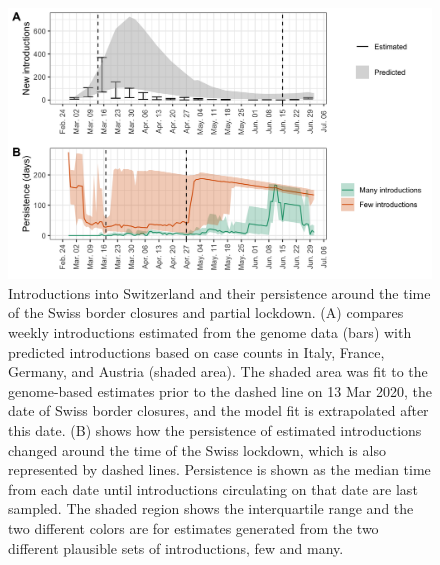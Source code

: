 \documentclass[9pt,twoside,lineno]{pnas-new}
\begin{document}
\begin{figure}[h!]
    \centering
    \includegraphics[width=\linewidth]{figures/introductions_and_persistence_v2.png}
    \caption{Introductions into Switzerland and their persistence around the time of the Swiss border closures and partial lockdown. (A) compares weekly introductions estimated from the genome data (bars) with predicted introductions based on case counts in Italy, France, Germany, and Austria (shaded area). The shaded area was fit to the genome-based estimates prior to the dashed line on 13 Mar 2020, the date of Swiss border closures, and the model fit is extrapolated after this date. (B) shows how the persistence of estimated introductions changed around the time of the Swiss lockdown, which is also represented by dashed lines. Persistence is shown as the median time from each date until introductions circulating on that date are last sampled. The shaded region shows the interquartile range and the two different colors are for estimates generated from the two different plausible sets of introductions, few and many.}
    \label{fig:introductions_and_persistence_v2}
\end{figure}
\end{document}
